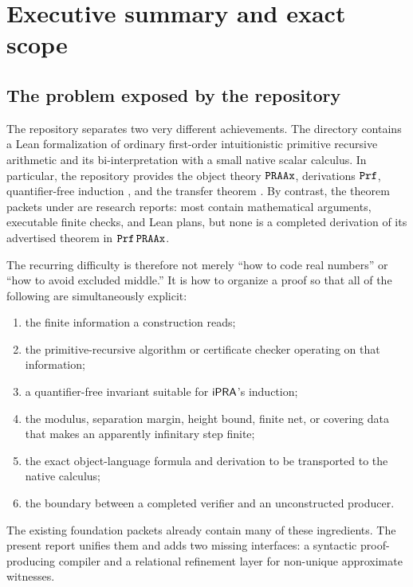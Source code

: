 \section{Executive summary and exact scope}

\subsection{The problem exposed by the repository}

The repository separates two very different achievements.  The directory
 contains a Lean formalization of ordinary first-order
intuitionistic primitive recursive arithmetic and its bi-interpretation with a
small native scalar calculus.  In particular, the repository provides the
object theory \(\texttt{PRAAx}\), derivations \(\texttt{Prf}\), quantifier-free induction
, and the transfer theorem .  By contrast,
the theorem packets under  are research reports: most contain
mathematical arguments, executable finite checks, and Lean plans, but none is a
completed derivation of its advertised theorem in \(\texttt{Prf}\,\texttt{PRAAx}\).

The recurring difficulty is therefore not merely ``how to code real numbers''
or ``how to avoid excluded middle.''  It is how to organize a proof so that
all of the following are simultaneously explicit:

\begin{enumerate}[label=(\arabic*)]
\item the finite information a construction reads;
\item the primitive-recursive algorithm or certificate checker operating on
      that information;
\item a quantifier-free invariant suitable for \(\mathsf{iPRA}\)'s induction;
\item the modulus, separation margin, height bound, finite net, or covering
      data that makes an apparently infinitary step finite;
\item the exact object-language formula and derivation to be transported to
      the native calculus;
\item the boundary between a completed verifier and an unconstructed producer.
\end{enumerate}

The existing foundation packets already contain many of these ingredients.
The present report unifies them and adds two missing interfaces: a syntactic
proof-producing compiler and a relational refinement layer for non-unique
approximate witnesses.

